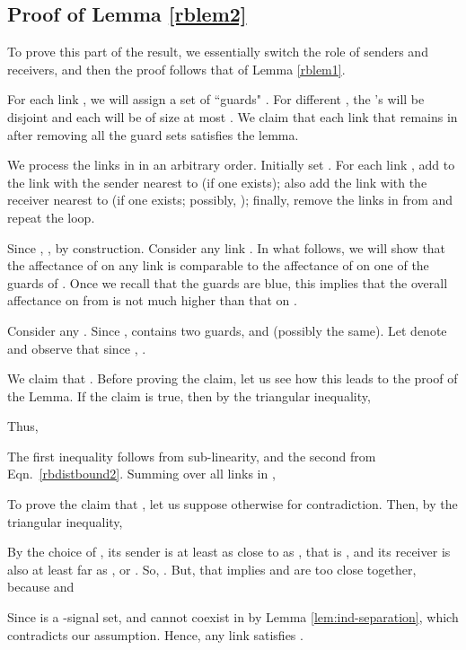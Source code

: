 \documentclass[11pt]{amsart}
\begin{document}
\subsection{Proof of Lemma \ref{rblem2}}

To prove this part of the result, we essentially switch the role of
senders and receivers, and then the proof follows that of Lemma \ref{rblem1}.

For each link , we will assign a set of ``guards" .
For different , the 's will be disjoint and each  will be of size at most . 
We claim that each link  that
remains in  after removing all the guard sets satisfies the lemma.

We process the links in  in an arbitrary order.
Initially set .
For each link , add to  the link 
with the sender nearest to
 (if one exists); also add the link  with the
receiver nearest to  (if one exists; possibly, ); 
finally, remove the links in  from  and repeat the loop.

\iffalse
\begin{figure}[htbp]
  \begin{center}
\texttt{[image: red-blue2.eps]}
  \end{center}
\caption{Example configuration of guards and points. Guard 
  (on left) is the nearest blue receiver to red point 
  (in center) among those of links larger than . 
  Similarly,  is the nearest blue sender to 
 among those of links larger than . } 
\label{fig:red-blue2}
\end{figure}
\fi

Since , , by construction.
Consider any link .
In what follows, we will show that the affectance of  on any link  
 is comparable to the affectance of  on one of the guards of . 
Once we recall that the guards are blue, this implies that the overall affectance
on  from  is not much higher than that on .

Consider any .
Since ,  contains two guards,
 and  (possibly the same).
Let  denote  and observe that
since , .

We claim that . Before proving the claim, let us see how 
this leads to the proof of the Lemma. If the claim is true, then by the triangular inequality,


Thus, 

The first inequality follows from sub-linearity, and the second from Eqn.~\ref{rbdistbound2}.
Summing over all links in ,


To prove the claim that , let us suppose otherwise for contradiction.
Then, by the triangular inequality,

By the choice of , its sender is at least as close to
 as , that is ,
and its receiver is also at least far as , or
. So, .
But, that implies  and  are too close together, because
 and

Since  is a -signal set,  
 and  cannot coexist in  by Lemma \ref{lem:ind-separation},
which contradicts our assumption. 
Hence, any link  satisfies . 
\end{document}
